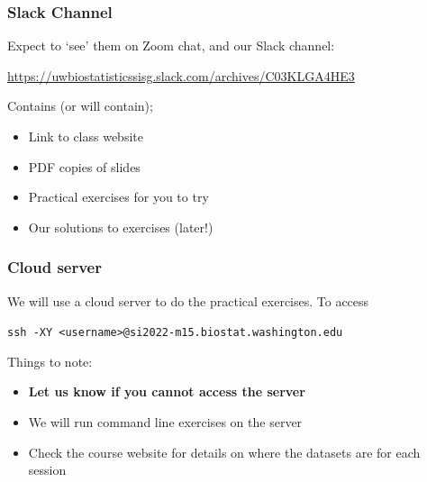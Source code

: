 \documentclass{beamer}
\begin{document}
\begin{frame}
\end{frame}



\begin{frame}[fragile]
\frametitle{\bf Slack Channel}

Expect to `see' them on Zoom chat, and our Slack channel:
{\color{red}
 
\url{https://uwbiostatisticssisg.slack.com/archives/C03KLGA4HE3}


}
\vspace{.3cm}
Contains (or will contain);
\begin{itemize}
\item Link to class website
\item PDF copies of slides
\item Practical exercises for you to try
\item Our solutions to exercises (later!)
\end{itemize}
\end{frame}



\begin{frame}[fragile]
	\frametitle{\bf Cloud server}
	
	We will use a cloud server to do the practical exercises. To access 
	{\color{red}
		
		\verb+ssh -XY <username>@si2022-m15.biostat.washington.edu+
	}

	\vspace{1em}
	Things to note:
	\begin{itemize}
		\item {\bf Let us know if you cannot access the server}
		\item We will run command line exercises on the server
		\item Check the course website for details on where the datasets are for each session
	\end{itemize}
\end{frame}
\end{document}
